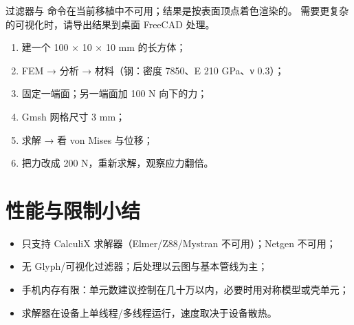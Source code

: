 
\begin{warn}[后处理的两个限制]
 过滤器与  命令在当前移植中不可用；结果是按表面顶点着色渲染的。
需要更复杂的可视化时，请导出结果到桌面 FreeCAD 处理。
\end{warn}

\begin{practice}[练习：悬臂梁]
\begin{enumerate}
  \item 建一个 100 × 10 × 10 mm 的长方体；
  \item FEM → 分析 → 材料（钢：密度 7850、E 210 GPa、ν 0.3）；
  \item 固定一端面；另一端面加 100 N 向下的力；
  \item Gmsh 网格尺寸 3 mm；
  \item 求解 → 看 von Mises 与位移；
  \item 把力改成 200 N，重新求解，观察应力翻倍。
\end{enumerate}
\end{practice}

\section{性能与限制小结}

\begin{itemize}
  \item 只支持 CalculiX 求解器（Elmer/Z88/Mystran 不可用）；Netgen 不可用；
  \item 无 Glyph/可视化过滤器；后处理以云图与基本管线为主；
  \item 手机内存有限：单元数建议控制在几十万以内，必要时用对称模型或壳单元；
  \item 求解器在设备上单线程/多线程运行，速度取决于设备散热。
\end{itemize}
